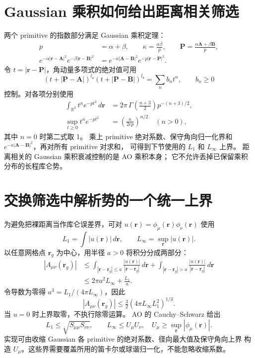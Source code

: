 \documentclass[UTF8,fontset=fandol,11pt,a4paper]{ctexart}
\numberwithin{equation}{section}
\begin{document}
\section{Gaussian 乘积如何给出距离相关筛选}
两个 primitive 的指数部分满足 Gaussian 乘积定理：
\begin{align}
p&=\alpha+\beta,\qquad \kappa=\frac{\alpha\beta}{p},\qquad
\bm P=\frac{\alpha\bm A+\beta\bm B}{p},\\
e^{-\alpha|\bm r-\bm A|^2}e^{-\beta|\bm r-\bm B|^2}
&=e^{-\kappa|\bm A-\bm B|^2}e^{-p|\bm r-\bm P|^2}.
\end{align}
令 \(t=|\bm r-\bm P|\)，角动量多项式的绝对值可用
\begin{equation}
(t+|\bm P-\bm A|)^{l_a}(t+|\bm P-\bm B|)^{l_b}
=\sum_n b_nt^n,\qquad b_n\geq0
\end{equation}
控制。对各项分别使用
\begin{align}
\int_{\mathbb R^3}t^n e^{-pt^2}\,d\bm r
&=2\pi\,\Gamma\!\left(\frac{n+3}{2}\right)p^{-(n+3)/2},\\
\sup_{t\geq0}t^ne^{-pt^2}
&=\left(\frac{n}{2ep}\right)^{n/2}\quad(n>0),
\end{align}
其中 \(n=0\) 时第二式取 1。
乘上 primitive 绝对系数、保守角向归一化界和
\(e^{-\kappa|\bm A-\bm B|^2}\)，再对所有 primitive 对求和，
可得到下节使用的 \(L_1\) 和 \(L_\infty\) 上界。
距离相关的 Gaussian 乘积衰减控制的是 AO 乘积本身；
它不允许丢掉已保留乘积分布的长程库仑势。

\section{交换筛选中解析势的一个统一上界}
\label{sec:potentialbound}
为避免把裸距离当作库仑误差界，可对
\(u(\bm r)=\phi_\mu(\bm r)\phi_\nu(\bm r)\) 使用
\begin{equation}
L_1=\int |u(\bm r)|\,d\bm r,\qquad
L_\infty=\sup_{\bm r}|u(\bm r)|.
\end{equation}
以任意网格点 \(\bm r_g\) 为中心，用半径 \(a>0\) 将积分分成两部分：
\begin{align}
|A_{\mu\nu}(\bm r_g)|
&\leq
\int_{|\bm r-\bm r_g|\leq a}\frac{|u(\bm r)|}{|\bm r-\bm r_g|}
\,d\bm r
+\int_{|\bm r-\bm r_g|>a}\frac{|u(\bm r)|}{|\bm r-\bm r_g|}
\,d\bm r\\
&\leq 2\pi a^2L_\infty+\frac{L_1}{a}.
\end{align}
令导数为零得 \(a^3=L_1/(4\pi L_\infty)\)，因此
\begin{equation}
\boxed{|A_{\mu\nu}(\bm r_g)|
\leq \tfrac32(4\pi L_\infty L_1^2)^{1/3}.}
\label{eq:uniformV}
\end{equation}
当 \(u=0\) 时上界取零，不执行除零运算。
AO 的 Cauchy--Schwarz 给出
\begin{equation}
L_1\leq\sqrt{S_{\mu\mu}S_{\nu\nu}},\qquad
L_\infty\leq U_\mu U_\nu,\quad
U_\mu\geq\sup_{\bm r}|\phi_\mu(\bm r)|.
\end{equation}
实现可由收缩 Gaussian 各 primitive 的绝对系数、径向最大值及保守角向上界
构造 \(U_\mu\)。这些界需要覆盖所用的笛卡尔或球谐归一化，不能忽略收缩系数。
\end{document}
